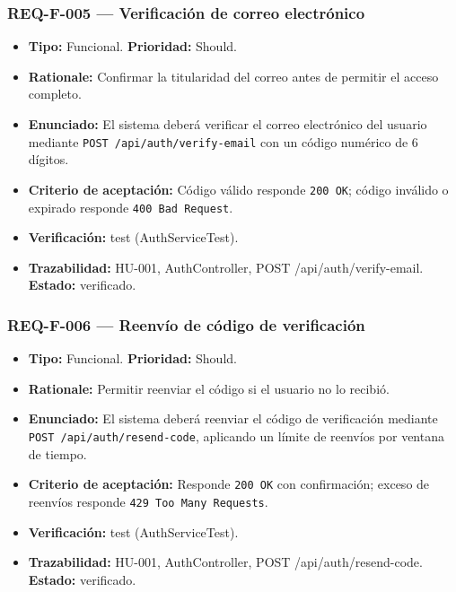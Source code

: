 \documentclass[12pt,a4paper]{article}
\begin{document}
\subsubsection{REQ-F-005 --- Verificación de correo electrónico}
\begin{itemize}
  \item \textbf{Tipo:} Funcional. \textbf{Prioridad:} Should.
  \item \textbf{Rationale:} Confirmar la titularidad del correo antes de permitir el acceso completo.
  \item \textbf{Enunciado:} El sistema deberá verificar el correo electrónico del usuario mediante \texttt{POST /api/auth/verify-email} con un código numérico de 6 dígitos.
  \item \textbf{Criterio de aceptación:} Código válido responde \texttt{200 OK}; código inválido o expirado responde \texttt{400 Bad Request}.
  \item \textbf{Verificación:} test (AuthServiceTest).
  \item \textbf{Trazabilidad:} HU-001, AuthController, POST /api/auth/verify-email. \textbf{Estado:} verificado.
\end{itemize}

\subsubsection{REQ-F-006 --- Reenvío de código de verificación}
\begin{itemize}
  \item \textbf{Tipo:} Funcional. \textbf{Prioridad:} Should.
  \item \textbf{Rationale:} Permitir reenviar el código si el usuario no lo recibió.
  \item \textbf{Enunciado:} El sistema deberá reenviar el código de verificación mediante \texttt{POST /api/auth/resend-code}, aplicando un límite de reenvíos por ventana de tiempo.
  \item \textbf{Criterio de aceptación:} Responde \texttt{200 OK} con confirmación; exceso de reenvíos responde \texttt{429 Too Many Requests}.
  \item \textbf{Verificación:} test (AuthServiceTest).
  \item \textbf{Trazabilidad:} HU-001, AuthController, POST /api/auth/resend-code. \textbf{Estado:} verificado.
\end{itemize}
\end{document}
